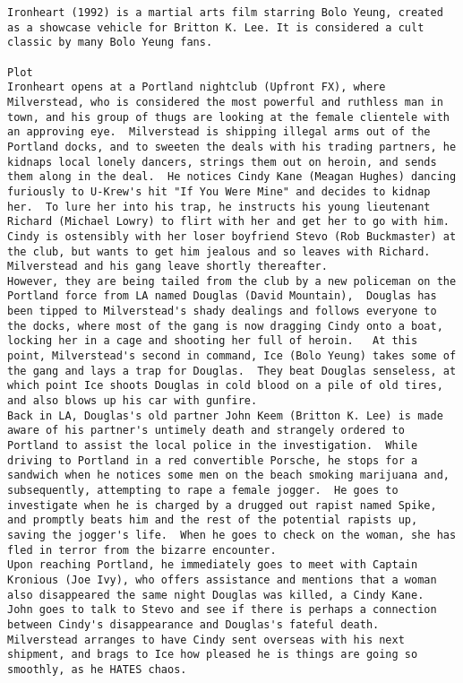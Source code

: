 \documentclass[11pt]{article}
\begin{document}
    \begin{Verbatim}[commandchars=\\\{\}]
Ironheart (1992) is a martial arts film starring Bolo Yeung, created as a showcase vehicle for Britton K. Lee. It is considered a cult classic by many Bolo Yeung fans.

Plot
Ironheart opens at a Portland nightclub (Upfront FX), where Milverstead, who is considered the most powerful and ruthless man in town, and his group of thugs are looking at the female clientele with an approving eye.  Milverstead is shipping illegal arms out of the Portland docks, and to sweeten the deals with his trading partners, he kidnaps local lonely dancers, strings them out on heroin, and sends them along in the deal.  He notices Cindy Kane (Meagan Hughes) dancing furiously to U-Krew's hit "If You Were Mine" and decides to kidnap her.  To lure her into his trap, he instructs his young lieutenant Richard (Michael Lowry) to flirt with her and get her to go with him.  Cindy is ostensibly with her loser boyfriend Stevo (Rob Buckmaster) at the club, but wants to get him jealous and so leaves with Richard.  Milverstead and his gang leave shortly thereafter.
However, they are being tailed from the club by a new policeman on the Portland force from LA named Douglas (David Mountain),  Douglas has been tipped to Milverstead's shady dealings and follows everyone to the docks, where most of the gang is now dragging Cindy onto a boat, locking her in a cage and shooting her full of heroin.   At this point, Milverstead's second in command, Ice (Bolo Yeung) takes some of the gang and lays a trap for Douglas.  They beat Douglas senseless, at which point Ice shoots Douglas in cold blood on a pile of old tires, and also blows up his car with gunfire.
Back in LA, Douglas's old partner John Keem (Britton K. Lee) is made aware of his partner's untimely death and strangely ordered to Portland to assist the local police in the investigation.  While driving to Portland in a red convertible Porsche, he stops for a sandwich when he notices some men on the beach smoking marijuana and, subsequently, attempting to rape a female jogger.  He goes to investigate when he is charged by a drugged out rapist named Spike, and promptly beats him and the rest of the potential rapists up, saving the jogger's life.  When he goes to check on the woman, she has fled in terror from the bizarre encounter.
Upon reaching Portland, he immediately goes to meet with Captain Kronious (Joe Ivy), who offers assistance and mentions that a woman also disappeared the same night Douglas was killed, a Cindy Kane.  John goes to talk to Stevo and see if there is perhaps a connection between Cindy's disappearance and Douglas's fateful death.  Milverstead arranges to have Cindy sent overseas with his next shipment, and brags to Ice how pleased he is things are going so smoothly, as he HATES chaos.

\end{Verbatim}
\end{document}
